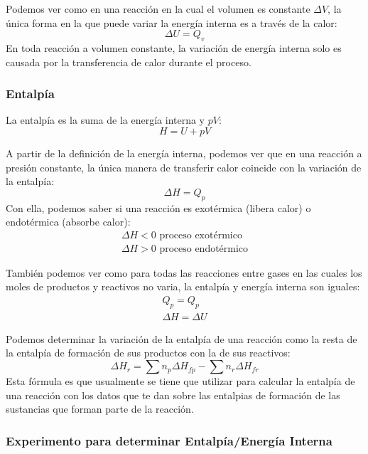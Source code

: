 \documentclass[arial,a4paper,print]{article}
\begin{document}
Podemos ver como en una reacción en la cual el volumen es constante $\Delta V$, la única forma en la que puede variar la energía interna es a través de la calor:
\begin{equation*}
	\Delta U = Q_{v}
\end{equation*}
En toda reacción a volumen constante, la variación de energía interna solo es causada por la transferencia de calor durante el proceso. 

\subsubsection{Entalpía}
La entalpía es la suma de la energía interna y $pV$:
\begin{equation*}
	H = U + pV
\end{equation*}

A partir de la definición de la energía interna, podemos ver que en una reacción a presión constante, la única manera de transferir calor coincide con la variación de la entalpía:
\begin{equation*}
	\Delta H = Q_{p}
\end{equation*}
Con ella, podemos saber si una reacción es exotérmica (libera calor) o endotérmica (absorbe calor):
\begin{align*}
	\Delta H < 0 \text{ proceso exotérmico} \\
	\Delta H > 0 \text{ proceso endotérmico}
\end{align*}

También podemos ver como para todas las reacciones entre gases en las cuales los moles de productos y reactivos no varia, la entalpía y energía interna son iguales:
\begin{align*}
	Q_{p} = Q_{p} \\ \Delta H = \Delta U
\end{align*}

Podemos determinar la variación de la entalpía de una reacción como la resta de la entalpía de formación de sus productos con la de sus reactivos:
\begin{equation}
	\Delta H_{r} = \sum n_{p}\Delta H_{fp} - \sum n_{r}\Delta H_{fr}
\label{delta_H}
\end{equation}
Esta fórmula es que usualmente se tiene que utilizar para calcular la entalpía de una reacción con los datos que te dan sobre las entalpias de formación de las sustancias que forman parte de la reacción. 

\subsubsection{Experimento para determinar Entalpía/Energía Interna}
\end{document}

